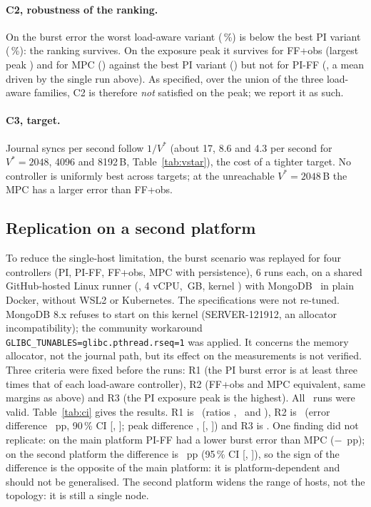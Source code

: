 \documentclass[smallextended]{svjour3}
\begin{document}
\paragraph{C2, robustness of the ranking.}
On the burst error the worst load-aware variant (\SensWorstAwareErr\,\%) is below the best PI variant (\SensBestPIErr\,\%): the ranking survives. On the exposure peak it survives for FF+obs (largest peak \SensMaxPeakFFO) and for MPC (\SensMaxPeakMPCP)
against the best PI variant (\SensMinPeakPIT) but not for PI-FF (\SensPIFFkpPeak, a mean driven by the single run above). As specified, over the union of the three load-aware families, C2 is therefore \emph{not} satisfied on the peak; we report it as such.
\paragraph{C3, target.}
Journal syncs per second follow $1/V^*$ (about 17, 8.6 and 4.3 per second for $V^*=2048$, 4096 and 8192\,B, Table~\ref{tab:vstar}), the cost of a tighter target. No controller is uniformly best across targets;
at the unreachable $V^*=2048$\,B the MPC has a larger error than FF+obs.



\subsection{Replication on a second platform}\label{sec:replication}
To reduce the single-host limitation, the burst scenario was replayed for four controllers (PI, PI-FF, FF+obs, MPC with persistence), 6 runs each, on a shared GitHub-hosted Linux runner
(\CICpu, 4 vCPU, \CIRam\,GB, kernel \CIKernel) with MongoDB \CIImage\ in plain Docker, without WSL2 or Kubernetes. The specifications were not re-tuned. MongoDB 8.x refuses to start on this kernel
(SERVER-121912, an allocator incompatibility); the community workaround \texttt{GLIBC\_TUNABLES=glibc.pthread.rseq=1} was applied. It concerns the memory allocator, not the journal path, but its effect on the
measurements is not verified. Three criteria were fixed before the runs: R1 (the PI burst error is at least three times that of each load-aware controller), R2 (FF+obs and MPC equivalent, same margins as above) and R3
(the PI exposure peak is the highest). All \CIN\ runs were valid.
Table~\ref{tab:ci} gives the results. R1 is \CIRone\ (ratios \CIRatioPIFF, \CIRatioFFO\ and \CIRatioMPCP), R2 is \CIRtwo\ (error difference \CIeqMaeD\ pp, 90\,\% CI [\CIeqMaeLo, \CIeqMaeHi]; peak difference
\CIeqPeakD, [\CIeqPeakLo, \CIeqPeakHi]) and R3 is \CIRthree. One finding did not replicate: on the main platform PI-FF had a lower burst error than MPC ($-$\cAMaePIFFMPCPS\ pp); on the second platform the difference is
\CIPIFFvsMPCD\ pp (95\,\% CI [\CIPIFFvsMPCLo, \CIPIFFvsMPCHi]), so the sign of the difference is the opposite of the main platform: it is platform-dependent and should not be generalised.
The second platform widens the range of hosts, not the topology: it is still a single node.

\end{document}
